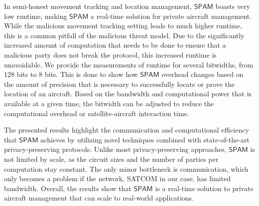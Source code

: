 \documentclass[9pt,sigconf,screen]{acmart}
\newcommand\sys{$\mathsf{SPAM}$\xspace}
\begin{document}
In semi-honest movement tracking and location management, \sys boasts very low runtime, making \sys a real-time solution for private aircraft management. While the malicious movement tracking setting leads to much higher runtime, this is a common pitfall of the malicious threat model. Due to the significantly increased amount of computation that needs to be done to ensure that a malicious party does not break the protocol, this increased runtime is unavoidable. We provide the measurements of runtime for several bitwidths, from 128 bits to 8 bits. This is done to show how \sys overhead changes based on the amount of precision that is necessary to successfully locate or prove the location of an aircraft. Based on the bandwidth and computational power that is available at a given time, the bitwidth can be adjusted to reduce the computational overhead or satellite-aircraft interaction time. 

The presented results highlight the communication and computational efficiency that \sys achieves by utilizing novel techniques combined with state-of-the-art privacy-preserving protocols. Unlike most privacy-preserving approaches, \sys is not limited by scale, as the circuit sizes and the number of parties per computation stay constant. The only minor bottleneck is communication, which only becomes a problem if the network, SATCOM in our case, has limited bandwidth. Overall, the results show that \sys is a real-time solution to private aircraft management that can scale to real-world applications.

\end{document}
